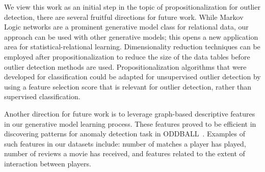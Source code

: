 	We view this work as an initial step in the topic of propositionalization for outlier detection, there are several fruitful directions for future work. While Markov Logic networks are a prominent generative model class for relational data, our approach can be used with  other generative models; this opens a new application area for statistical-relational learning. Dimensionality reduction techniques can be employed after propositionalization to reduce the size of the data tables before outlier detection methods are used. Propositionalization algorithms that were developed for classification could be adapted for unsupervised outlier detection by using a feature selection score that is relevant for outlier detection, rather than supervised classification.
	
	Another direction for future work is to leverage graph-based descriptive features in our generative model learning process.
	These features proved to be efficient in discovering patterns for anomaly detection task in ODDBALL~\cite{Akoglu2010}. Examples of such features in our datasets include: number of matches a player has played, number of reviews a movie has received, and features related to the extent of interaction between players.
